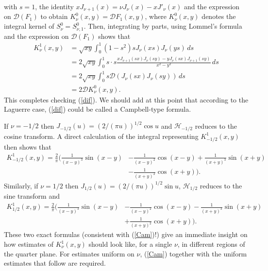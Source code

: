 \documentclass[leqno,a4paper]{amsart}
\begin{document}
with $s=1$, the identity $xJ_{\nu+1}(x)=\nu J_{\nu}(x)-xJ'_{\nu}(x)$
and the expression on $\mathcal{D}(F_1)$
to obtain $K^0_\nu(x,y)=\mathcal{D}F_1(x,y)$, where $K^0_\nu(x,y)$ denotes
the integral kernel of $S^0_\nu=S^0_{\nu,1}$.
Then, integrating by parts, using Lommel's formula and
the expression on $\mathcal{D}(F_1)$ shows that
\begin{align*}
K^{1}_\nu(x,y)&=\sqrt{xy}\int_0^1(1-s^2)sJ_{\nu}(xs)J_\nu(ys)\, ds\\
&=2\sqrt{xy}\int_0^1 s\cdot
s\frac{xJ_{\nu+1}(sx)J_{\nu}(sy)-yJ_{\nu}(sx)J_{\nu+1}(sy)}{x^2-y^2}\, ds\\
&=2\sqrt{xy}\int_0^1 s\mathcal{D}(J_\nu(sx)J_\nu(sy))\,ds\\
&=2\mathcal{D}K^{0}_\nu(x,y).
\end{align*}
This completes checking (\ref{dif}). We should add at this point that according
to the Laguerre case, (\ref{dif}) could be called a Campbell-type formula.

If $\nu=-1/2$ then $J_{-1/2}(u) = (2/(\pi u))^{1/2}\cos u$ and ${\mathcal H}_{-1/2}$
reduces to the cosine transform. A direct calculation of the integral
representing $K^1_{-1/2}(x,y)$ then shows that
\begin{align*}
K^1_{-1/2}(x,y) = \frac2\pi\bigg(\frac1{(x-y)^3}\sin(x-y)
&-\frac1{(x-y)^2}\cos(x-y) + \frac1{(x+y)^3}\sin(x+y)\\
&-\frac1{(x+y)^2}\cos(x+y)\bigg).
\end{align*}
Similarly, if $\nu=1/2$ then $J_{1/2}(u) = (2/(\pi u))^{1/2}\sin u$,
${\mathcal H}_{1/2}$ reduces to the sine transform and
\begin{align*}
K^1_{1/2}(x,y) = \frac2\pi\bigg(\frac1{(x-y)^3}\sin(x-y)
&-\frac1{(x-y)^2}\cos(x-y) - \frac1{(x+y)^3}\sin(x+y)\\
&+\frac1{(x+y)^2}\cos(x+y)\bigg).
\end{align*}
These two exact formulas (consistent with (\ref{Cam})!) give an
immediate insight on how estimates of
$K^1_\nu(x,y)$ should look like, for a single $\nu$, in different regions
of the quarter plane. For estimates uniform on $\nu$, (\ref{Cam}) together
with the uniform estimates that follow are required.
\end{document}
